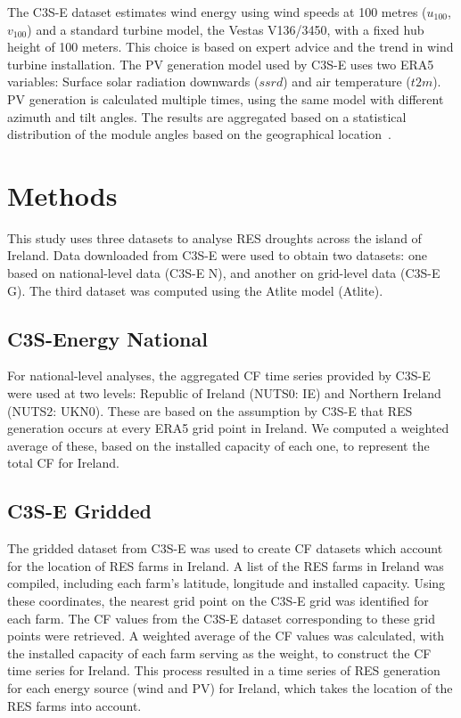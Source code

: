 \documentclass[a4paper, 11p1t]{article}
\begin{document}
The C3S-E dataset estimates wind energy using wind speeds at 100 metres ($u_{100}$, $v_{100}$) and a standard turbine model, the Vestas V136/3450, with a fixed hub height of 100 meters. This choice is based on expert advice and the trend in wind turbine installation. The PV generation model used by C3S-E uses two ERA5 variables: Surface solar radiation downwards ($ssrd$) and air temperature ($t2m$). PV generation is calculated multiple times, using the same model with different azimuth and tilt angles. The results are aggregated based on a statistical distribution of the module angles based on the geographical location~\cite{saintdrenan2018solar}.

\section{Methods}
\label{sec:Methods}

This study uses three datasets to analyse RES droughts across the island of Ireland. Data downloaded from C3S-E were used to obtain two datasets: one based on national-level data (C3S-E N), and another on grid-level data (C3S-E G). The third dataset was computed using the Atlite model (Atlite).

\subsection{C3S-Energy National}
\label{sec:c3se_n}

For national-level analyses, the aggregated CF time series provided by C3S-E were used at two levels: Republic of Ireland (NUTS0: IE) and Northern Ireland (NUTS2: UKN0). These are based on the assumption by C3S-E that RES generation occurs at every ERA5 grid point in Ireland. We computed a weighted average of these, based on the installed capacity of each one, to represent the total CF for Ireland.

\subsection{C3S-E Gridded}
\label{sec:c3se_g}

The gridded dataset from C3S-E was used to create CF datasets which account for the location of RES farms in Ireland. A list of the RES farms in Ireland was compiled, including each farm’s latitude, longitude and installed capacity. Using these coordinates, the nearest grid point on the C3S-E grid was identified for each farm. The CF values from the C3S-E dataset corresponding to these grid points were retrieved. A weighted average of the CF values was calculated, with the installed capacity of each farm serving as the weight, to construct the CF time series for Ireland. This process resulted in a time series of RES generation for each energy source (wind and PV) for Ireland, which takes the location of the RES farms into account.
\end{document}
